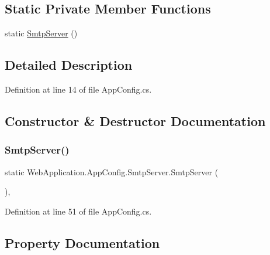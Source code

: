 \subsection*{Static Private Member Functions}
\begin{DoxyCompactItemize}
\item 
static \mbox{\hyperlink{classWebApplication_1_1AppConfig_1_1SmtpServer_a7f7c5ac6ca2203a170f655f470b7f44e}{Smtp\+Server}} ()
\end{DoxyCompactItemize}


\subsection{Detailed Description}


Definition at line 14 of file App\+Config.\+cs.



\subsection{Constructor \& Destructor Documentation}
\mbox{\label{classWebApplication_1_1AppConfig_1_1SmtpServer_a7f7c5ac6ca2203a170f655f470b7f44e}} 
\subsubsection{\texorpdfstring{SmtpServer()}{SmtpServer()}}
{\footnotesize\ttfamily static Web\+Application.\+App\+Config.\+Smtp\+Server.\+Smtp\+Server (\begin{DoxyParamCaption}{ }\end{DoxyParamCaption})\hspace{0.3cm}{\ttfamily [static]}, {\ttfamily [private]}}



Definition at line 51 of file App\+Config.\+cs.



\subsection{Property Documentation}
\mbox{\label{classWebApplication_1_1AppConfig_1_1SmtpServer_a2e27e5acbfb3359f885c0bc8cff8e0d8}} 
